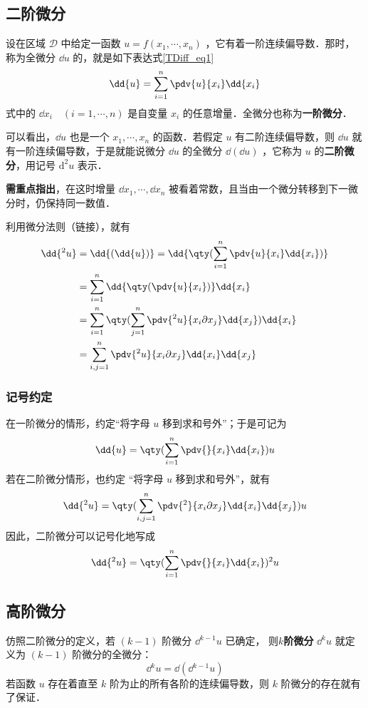 \subsection{二阶微分}
设在区域 $\mathcal{D}$ 中给定一函数 $u=f(x_1,\cdots,x_n)$ ，它有着一阶连续偏导数．那时，称为全微分 $\dd{u}$ 的，就是如下表达式\autoref{TDiff_eq1}~
\begin{equation}
\dd{u}=\sum_{i=1}^n \pdv{u}{x_i}\dd{x_i}
\end{equation}
式中的 $\dd{x_i}\quad(i=1,\cdots,n)$ 是自变量 $x_i$ 的任意增量．全微分也称为\textbf{一阶微分}．

可以看出，$\dd{u}$ 也是一个 $x_1,\cdots,x_n$ 的函数．若假定 $u$ 有二阶连续偏导数，则 $\dd{u}$ 就有一阶连续偏导数，于是就能说微分 $\dd{u}$ 的全微分 $\dd{(\dd u)}$ ，它称为 $u$ 的\textbf{二阶微分}，用记号 $\mathrm{d}^2u$ 表示．

\textbf{需重点指出}，在这时增量 $\dd{x_1},\cdots,\dd{x_n}$ 被看着常数，且当由一个微分转移到下一微分时，仍保持同一数值．

利用微分法则（链接），就有
\begin{equation}
\begin{aligned}
\dd{^2u}&=\dd{(\dd{u})}=\dd{\qty(\sum_{i=1}^n \pdv{u}{x_i}\dd{x_i})}\\
&=\sum_{i=1}^n \dd{\qty(\pdv{u}{x_i})}\dd{x_i}\\
&=\sum_{i=1}^n\qty(\sum_{j=1}^n\pdv{^2u}{x_i\partial x_j} \dd{x_j})\dd{x_i}\\
&=\sum_{i,j=1}^n\pdv{^2u}{x_i\partial x_j} \dd{x_i}\dd{x_j}
\end{aligned}
\end{equation}
\subsubsection{记号约定}
在一阶微分的情形，约定“将字母 $u$ 移到求和号外”；于是可记为
\begin{equation}
\dd{u}=\qty(\sum_{i=1}^n\pdv{}{x_i}\dd{x_i})u
\end{equation}
若在二阶微分情形，也约定 “将字母 $u$ 移到求和号外”，就有
\begin{equation}
\dd{^2u}=\qty(\sum_{i,j=1}^n\pdv{^2}{x_i\partial x_j} \dd{x_i}\dd{x_j})u
\end{equation}
因此，二阶微分可以记号化地写成
\begin{equation}
\dd{^2u}=\qty(\sum_{i=1}^n\pdv{}{x_i} \dd{x_i})^2u
\end{equation}
\subsection{高阶微分}
仿照二阶微分的定义，若 $(k-1)$ 阶微分 $\dd{^{k-1}}u$ 已确定， 则\textbf{$k$阶微分} $\dd{^ku}$ 就定义为 $(k-1)$ 阶微分的全微分：
\begin{equation}
\dd{^k u}=\dd{(\dd{^{k-1}}u)}
\end{equation}
 若函数 $u$ 存在着直至 $k$ 阶为止的所有各阶的连续偏导数，则 $k$ 阶微分的存在就有了保证．
